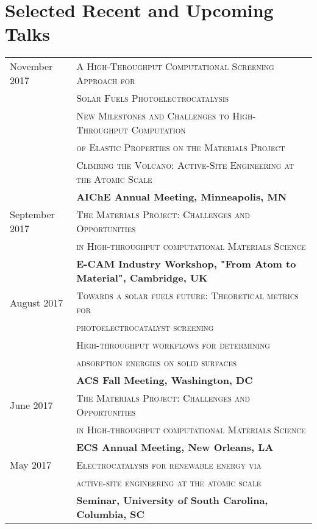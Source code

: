\documentclass[a4paper,10pt]{article}
\begin{document}
\section{Selected Recent and Upcoming Talks}
\begin{tabular}{ll}
November 2017 & \textsc{A High-Throughput Computational Screening Approach for}\\
& \textsc{Solar Fuels Photoelectrocatalysis} \vspace{0.02in} \\
&  \textsc{New Milestones and Challenges to High-Throughput Computation} \\ 
& \textsc{of Elastic Properties on the Materials Project} \vspace{0.02in} \\
& \textsc{Climbing the Volcano: Active-Site Engineering at the Atomic Scale} \vspace{0.04in}\\
& \textbf{AIChE Annual Meeting, Minneapolis, MN} \vspace{0.1in} \\
September 2017 & \textsc{The Materials Project: Challenges and Opportunities}\\
& \textsc{in High-throughput computational Materials Science} \vspace{0.04in} \\
& \textbf{E-CAM Industry Workshop, "From Atom to Material", Cambridge, UK} \vspace{0.1in} \\
August 2017 & \textsc{Towards a solar fuels future: Theoretical metrics for} \\
& \textsc{photoelectrocatalyst screening} \vspace{0.02in} \\
& \textsc{High-throughput workflows for determining} \\
& \textsc{adsorption energies on solid surfaces} \vspace{0.04in} \\
& \textbf{ACS Fall Meeting, Washington, DC} \vspace{0.1in} \\
June 2017 &\textsc{The Materials Project: Challenges and Opportunities}\\
& \textsc{in High-throughput computational Materials Science} \vspace{0.04in} \\
& \textbf{ECS Annual Meeting, New Orleans, LA} \vspace{0.06in} \\
May 2017 & \textsc{Electrocatalysis for renewable energy via}\\
& \textsc{active-site engineering at the atomic scale}\vspace{0.04in}\\
& \textbf{Seminar, University of South Carolina, Columbia, SC}\\
\end{tabular}
\end{document}
